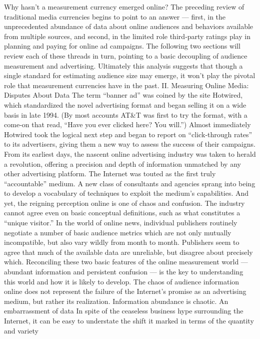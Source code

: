 Why hasn’t a measurement currency emerged online? The preceding
review of traditional media currencies begins to point to an answer —
first, in the unprecedented abundance of data about online audiences and
behaviors available from multiple sources, and second, in the limited role
third‐party ratings play in planning and paying for online ad campaigns.
The following two sections will review each of these threads in turn,
pointing to a basic decoupling of audience measurement and advertising.
Ultimately this analysis suggests that though a single standard for
estimating audience size may emerge, it won’t play the pivotal role that
measurement currencies have in the past.
II. Measuring Online Media: Disputes About Data
The term ``banner ad'' was coined by the site Hotwired, which
standardized the novel advertising format and began selling it on a wide
basis in late 1994. (By most accounts AT&T was first to try the format,
with a come‐on that read, ``Have you ever clicked here? You will.'')
Almost immediately Hotwired took the logical next step and began to
report on ``click‐through rates'' to its advertisers, giving them a new way
to assess the success of their campaigns.
From its earliest days, the nascent online advertising industry was taken
to herald a revolution, offering a precision and depth of information
unmatched by any other advertising platform. The Internet was touted as
the first truly ``accountable'' medium. A new class of consultants and
agencies sprang into being to develop a vocabulary of techniques to
exploit the medium’s capabilities.
And yet, the reigning perception online is one of chaos and confusion. The
industry cannot agree even on basic conceptual definitions, such as what
constitutes a ``unique visitor.'' In the world of online news, individual
publishers routinely negotiate a number of basic audience metrics which
are not only mutually incompatible, but also vary wildly from month to
month. Publishers seem to agree that much of the available data are
unreliable, but disagree about precisely which.
Reconciling these two basic features of the online measurement world —
abundant information and persistent confusion — is the key to
understanding this world and how it is likely to develop. The chaos of
audience information online does not represent the failure of the Internet’s
promise as an advertising medium, but rather its realization. Information
abundance is chaotic.
An embarrassment of data
In spite of the ceaseless business hype surrounding the Internet, it can be
easy to understate the shift it marked in terms of the quantity and variety
